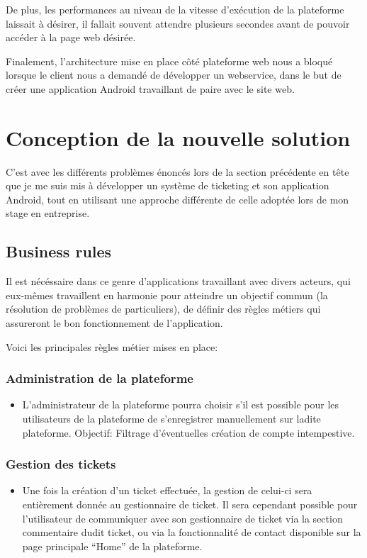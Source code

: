 \documentclass[12pt,table,a4paper]{report}
\begin{document}
De plus, les performances au niveau de la vitesse d'exécution de la plateforme laissait à désirer, il fallait souvent attendre plusieurs secondes avant de pouvoir accéder à la page web désirée.

Finalement, l'architecture mise en place côté plateforme web nous a bloqué lorsque le client nous a demandé de développer un webservice, dans le but de créer une application Android travaillant de paire avec le site web.

\section{Conception de la nouvelle solution}
C'est avec les différents problèmes énoncés lors de la section précédente en tête que je me suis mis à développer un système de ticketing et son application Android, tout en utilisant une approche différente de celle adoptée lors de mon stage en entreprise.

\subsection{Business rules}
Il est nécéssaire dans ce genre d'applications travaillant avec divers acteurs, qui eux-mêmes travaillent en harmonie pour atteindre un objectif commun (la résolution de problèmes de particuliers), de définir des règles métiers qui assureront le bon fonctionnement de l'application.

Voici les principales règles métier mises en place:

\subsubsection{Administration de la plateforme}
\begin{itemize}
	\item{L'administrateur de la plateforme pourra choisir s'il est possible pour les utilisateurs de la plateforme de s'enregistrer manuellement sur ladite plateforme. Objectif: Filtrage d'éventuelles création de compte intempestive.}
\end{itemize}

\subsubsection{Gestion des tickets}
\begin{itemize}
	\item{Une fois la création d'un ticket effectuée, la gestion de celui-ci sera entièrement donnée au gestionnaire de ticket. Il sera cependant possible pour l'utilisateur de communiquer avec son gestionnaire de ticket via la section commentaire dudit ticket, ou via la fonctionnalité de contact disponible sur la page principale "`Home"' de la plateforme.}
\end{itemize}
\end{document}
